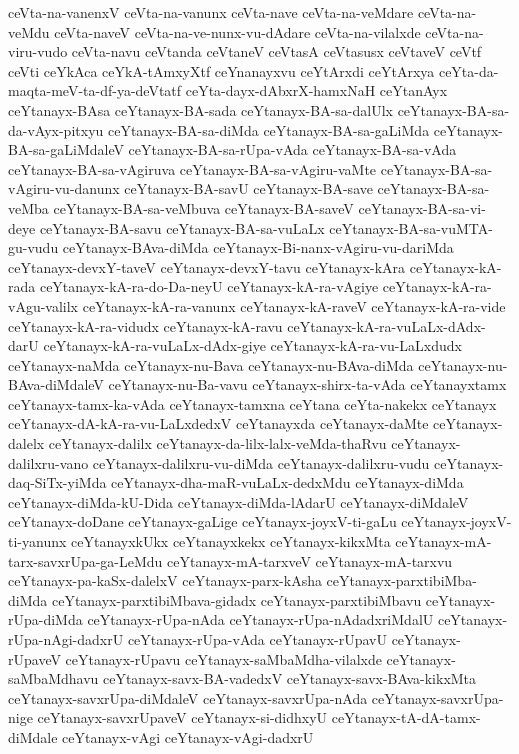 {ceVta-na-vanenxV
ceVta-na-vanunx
ceVta-nave
ceVta-na-veMdare
ceVta-na-veMdu
ceVta-naveV
ceVta-na-ve-nunx-vu-dAdare
ceVta-na-vilalxde
ceVta-na-viru-vudo
ceVta-navu
ceVtanda
ceVtaneV
ceVtasA
ceVtasusx
ceVtaveV
ceVtf
ceVti
ceYkAca
ceYkA-tAmxyXtf
ceYnanayxvu
ceYtArxdi
ceYtArxya
ceYta-da-maqta-meV-ta-df-ya-deVtatf
ceYta-dayx-dAbxrX-hamxNaH
ceYtanAyx
ceYtanayx-BAsa
ceYtanayx-BA-sada
ceYtanayx-BA-sa-dalUlx
ceYtanayx-BA-sa-da-vAyx-pitxyu
ceYtanayx-BA-sa-diMda
ceYtanayx-BA-sa-gaLiMda
ceYtanayx-BA-sa-gaLiMdaleV
ceYtanayx-BA-sa-rUpa-vAda
ceYtanayx-BA-sa-vAda
ceYtanayx-BA-sa-vAgiruva
ceYtanayx-BA-sa-vAgiru-vaMte
ceYtanayx-BA-sa-vAgiru-vu-danunx
ceYtanayx-BA-savU
ceYtanayx-BA-save
ceYtanayx-BA-sa-veMba
ceYtanayx-BA-sa-veMbuva
ceYtanayx-BA-saveV
ceYtanayx-BA-sa-vi-deye
ceYtanayx-BA-savu
ceYtanayx-BA-sa-vuLaLx
ceYtanayx-BA-sa-vuMTA-gu-vudu
ceYtanayx-BAva-diMda
ceYtanayx-Bi-nanx-vAgiru-vu-dariMda
ceYtanayx-devxY-taveV
ceYtanayx-devxY-tavu
ceYtanayx-kAra
ceYtanayx-kA-rada
ceYtanayx-kA-ra-do-Da-neyU
ceYtanayx-kA-ra-vAgiye
ceYtanayx-kA-ra-vAgu-valilx
ceYtanayx-kA-ra-vanunx
ceYtanayx-kA-raveV
ceYtanayx-kA-ra-vide
ceYtanayx-kA-ra-vidudx
ceYtanayx-kA-ravu
ceYtanayx-kA-ra-vuLaLx-dAdx-darU
ceYtanayx-kA-ra-vuLaLx-dAdx-giye
ceYtanayx-kA-ra-vu-LaLxdudx
ceYtanayx-naMda
ceYtanayx-nu-Bava
ceYtanayx-nu-BAva-diMda
ceYtanayx-nu-BAva-diMdaleV
ceYtanayx-nu-Ba-vavu
ceYtanayx-shirx-ta-vAda
ceYtanayxtamx
ceYtanayx-tamx-ka-vAda
ceYtanayx-tamxna
ceYtana
ceYta-nakekx
ceYtanayx
ceYtanayx-dA-kA-ra-vu-LaLxdedxV
ceYtanayxda
ceYtanayx-daMte
ceYtanayx-dalelx
ceYtanayx-dalilx
ceYtanayx-da-lilx-lalx-veMda-thaRvu
ceYtanayx-dalilxru-vano
ceYtanayx-dalilxru-vu-diMda
ceYtanayx-dalilxru-vudu
ceYtanayx-daq-SiTx-yiMda
ceYtanayx-dha-maR-vuLaLx-dedxMdu
ceYtanayx-diMda
ceYtanayx-diMda-kU-Dida
ceYtanayx-diMda-lAdarU
ceYtanayx-diMdaleV
ceYtanayx-doDane
ceYtanayx-gaLige
ceYtanayx-joyxV-ti-gaLu
ceYtanayx-joyxV-ti-yanunx
ceYtanayxkUkx
ceYtanayxkekx
ceYtanayx-kikxMta
ceYtanayx-mA-tarx-savxrUpa-ga-LeMdu
ceYtanayx-mA-tarxveV
ceYtanayx-mA-tarxvu
ceYtanayx-pa-kaSx-dalelxV
ceYtanayx-parx-kAsha
ceYtanayx-parxtibiMba-diMda
ceYtanayx-parxtibiMbava-gidadx
ceYtanayx-parxtibiMbavu
ceYtanayx-rUpa-diMda
ceYtanayx-rUpa-nAda
ceYtanayx-rUpa-nAdadxriMdalU
ceYtanayx-rUpa-nAgi-dadxrU
ceYtanayx-rUpa-vAda
ceYtanayx-rUpavU
ceYtanayx-rUpaveV
ceYtanayx-rUpavu
ceYtanayx-saMbaMdha-vilalxde
ceYtanayx-saMbaMdhavu
ceYtanayx-savx-BA-vadedxV
ceYtanayx-savx-BAva-kikxMta
ceYtanayx-savxrUpa-diMdaleV
ceYtanayx-savxrUpa-nAda
ceYtanayx-savxrUpa-nige
ceYtanayx-savxrUpaveV
ceYtanayx-si-didhxyU
ceYtanayx-tA-dA-tamx-diMdale
ceYtanayx-vAgi
ceYtanayx-vAgi-dadxrU
}
